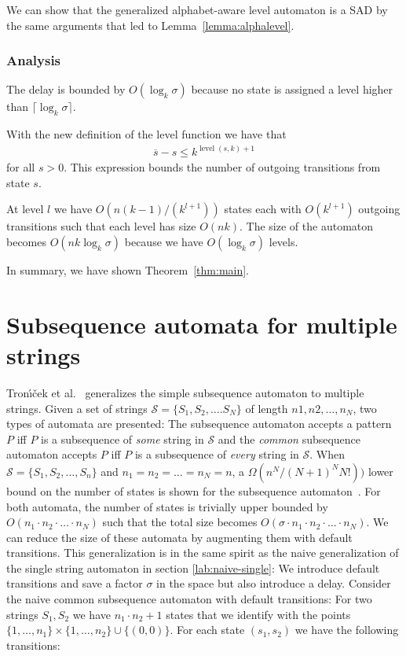 \documentclass[a4paper,11pt]{article}
\DeclareMathOperator{\level}{level}
\begin{document}
We can show that the generalized alphabet-aware level automaton is a SAD by the same arguments that led to Lemma~\ref{lemma:alphalevel}.
\subsubsection{Analysis}
The delay is bounded by $O(\log_k \sigma)$ because no state is assigned a level higher than $\lceil \log_k \sigma \rceil$.

With the new definition of the level function we have that 
\begin{gather*}
\overline{s} - s \leq k^{\level(s,k)+1}
\end{gather*}
for all $s>0$.
This expression bounds the number of outgoing transitions from state $s$.


At level $l$ we have $O(n(k-1)/(k^{l+1}))$ states each with $O(k^{l+1})$ outgoing transitions such that each level has size $O(nk)$. The size of the automaton becomes $O(nk\log_k \sigma)$ because we have $O(\log_k \sigma)$ levels.

In summary, we have shown Theorem~\ref{thm:main}.





    
    
\section{Subsequence automata for multiple strings}







Tron\'{\i}\v{c}ek et al.~\cite{CMT2003} generalizes the simple subsequence automaton to multiple strings. Given a set of strings $\mathcal{S}=\{S_1, S_2,\ldots. S_N\}$ of length $n1,n2, \ldots, n_N$, two types of automata are presented: The subsequence automaton accepts a pattern $P$ iff $P$ is a subsequence of \emph{some} string in $\mathcal{S}$ and the \emph{common} subsequence automaton accepts $P$ iff $P$ is a subsequence of \emph{every} string in $\mathcal{S}$. When $\mathcal{S}=\{S_1, S_2,\ldots, S_n\}$ and $ n_1 = n_2 =\ldots= n_N =n$, a $\Omega(n^N/(N+1)^NN!))$ lower bound on the number of states is shown for the subsequence automaton~\cite{tronivcek2005size}. For both automata, the number of states is trivially upper bounded by $O( n_1 \cdot  n_2  \cdot \ldots \cdot  n_N )$ such that the total size becomes $O(\sigma\cdot n_1 \cdot  n_2  \cdot \ldots \cdot  n_N )$. We can reduce the size of these automata by augmenting them with default transitions. This generalization is in the same spirit as the naive generalization of the single string automaton in section \ref{lab:naive-single}: We introduce default transitions and save a factor $\sigma$ in the space but also introduce a delay. Consider the naive common subsequence automaton with default transitions: For two strings $S_1,S_2$ we have $ n_1 \cdot  n_2 +1$ states that we identify with the points $\{1,\ldots,  n_1 \}\times\{1,\ldots,  n_2 \}\cup \{(0,0)\}$. For each state $(s_1,s_2)$ we have the following transitions:
\end{document}
